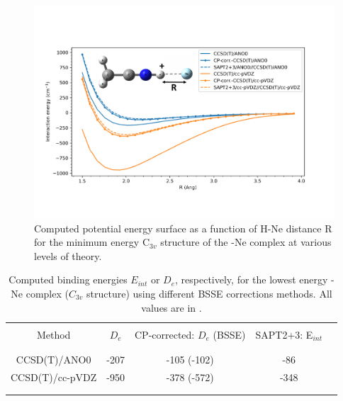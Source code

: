 \begin{figure}

	\centering
		\includegraphics[width=1\textwidth]{chapters/CH3CNH+/figures/iso1_comparison_with_Ne.pdf}
		\caption{Computed potential energy surface as a function of H-Ne distance R for the minimum energy C$_{3v}$ structure of the \pan-Ne complex at various levels of theory.}
	
	\label{FIG:bsse}
\end{figure}
\begin{table}

\caption{Computed binding energies $E_{int}$ or $D_e$, respectively, for the lowest energy \pan-Ne complex ($C_{3v}$ structure) using different BSSE corrections methods. All values are in \wn.}\label{tbl3}
    \centering
    \small
    
    \begin{tabular}{ccccc}

    \\\hline \hline\\
    
        Method          & $D_e$ & CP-corrected: $D_e$ (BSSE) & SAPT2+3: E$_{int}$ \\\\\hline\\
        
        CCSD(T)/ANO0    & -207      & -105 (-102)            & -86               \\
        CCSD(T)/cc-pVDZ & -950      & -378 (-572)            & -348              \\
    
    \\\hline \hline\\
    \end{tabular}
    

\end{table}
\normalsize

